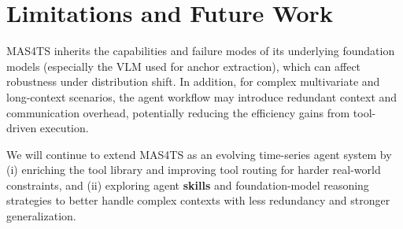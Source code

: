 \section{Limitations and Future Work}
MAS4TS inherits the capabilities and failure modes of its underlying foundation models (especially the VLM used for anchor extraction), which can affect robustness under distribution shift. In addition, for complex multivariate and long-context scenarios, the agent workflow may introduce redundant context and communication overhead, potentially reducing the efficiency gains from tool-driven execution.

We will continue to extend MAS4TS as an evolving time-series agent system by (i) enriching the tool library and improving tool routing for harder real-world constraints, and (ii) exploring agent \textbf{skills} and foundation-model reasoning strategies to better handle complex contexts with less redundancy and stronger generalization.